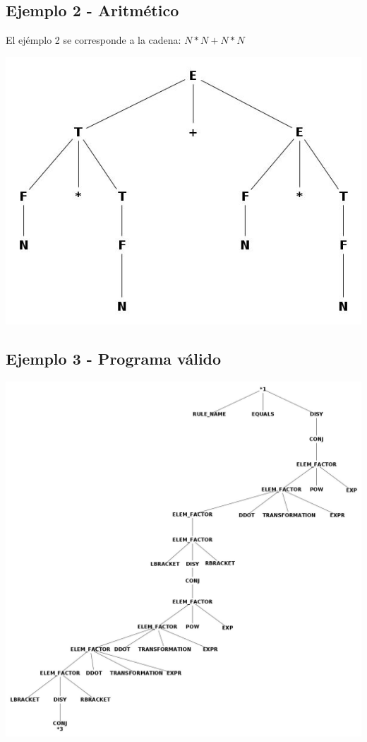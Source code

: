 \subsection{Ejemplo 2 - Aritm\'etico}
El ej\'emplo 2 se corresponde a la cadena:
$N*N+N*N$
\centerline{\includegraphics[scale=0.40]{arboles_derivacion/ejemplo2.jpg}}

\subsection{Ejemplo 3 - Programa v\'alido}
\centerline{\includegraphics[scale=0.40]{arboles_derivacion/cube1.jpg}}
